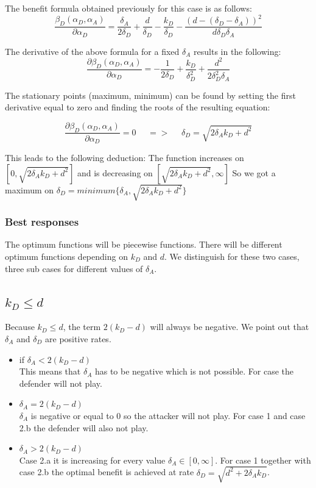 The benefit formula obtained previously for this case is as follows:
\begin{equation*}
\dfrac{\beta_{D}(\alpha_{D},\alpha_{A})}{\partial \alpha_{D}} = \dfrac{\delta_{A}}{2\delta_{D}} + \dfrac{d}{\delta_{D}} - \dfrac{k_{D}}{\delta_{D}} - \dfrac{(d-(\delta_{D} - \delta_{A}))^{2}}{d\delta_{D}\delta_{A}}
\end{equation*}

The derivative of the above formula for a fixed $\delta_{A}$ results in the following:
\begin{equation*}
\frac{\partial \beta_{D}(\alpha_{D},\alpha_{A})}{\partial \alpha_{D}} =  - \dfrac{1}{2\delta_{D}} + \dfrac{k_{D}}{\delta_{D}^{2}} + \dfrac{d^{2}}{2\delta_{D}^{2}\delta_{A}}
\end{equation*}


The stationary points (maximum, minimum) can be found by setting the first derivative equal to zero and finding the roots of the resulting equation:

\begin{equation*}
\frac{\partial \beta_{D}(\alpha_{D},\alpha_{A})}{\partial \alpha_{D}} =0 ~~~~~~ =>~~~~~~ \delta_{D} = \sqrt{2\delta_{A}k_{D} + d^{2}}
\end{equation*}


This leads to the following deduction: The function increases on $[0, \sqrt{2\delta_{A}k_{D} + d^{2}}]$ and is decreasing on $[\sqrt{2\delta_{A}k_{D} + d^{2}}, \infty]$ So we got a maximum on $\delta_{D} = minimum \{ \delta_{A}, \sqrt{2\delta_{A}k_{D} + d^{2}} \} $ \\

\subsubsection{Best responses}
The optimum functions will be piecewise functions. There will be different optimum functions depending on $k_{D}$ and $d$. We distinguish for these two cases, three sub cases for different values of $\delta_{A}$. 

\subsection*{$k_{D} \leq d$}
Because $k_{D} \leq d$, the term $2(k_{D} - d)$ will always be negative. We point out that $\delta_{A}$ and $\delta_{D}$ are positive rates. 
\begin{itemize}
\item if $\delta_{A} < 2(k_{D} - d)$ \\
This means that $\delta_{A}$ has to be negative which is not possible. For case the defender will not play.
\item $\delta_{A} = 2(k_{D} - d)$ \\
$\delta_{A}$ is negative or equal to 0 so the attacker will not play. For case 1 and case 2.b the defender will also not play.
\item $\delta_{A} > 2(k_{D} - d)$ \\
Case 2.a it is increasing for every value $\delta_{A} \in [0,\infty]$.  For case 1 together with case 2.b the optimal benefit is achieved at rate $\delta_{D} = \sqrt{d^{2} + 2\delta_{A}k_{D}}$.
\end{itemize}


